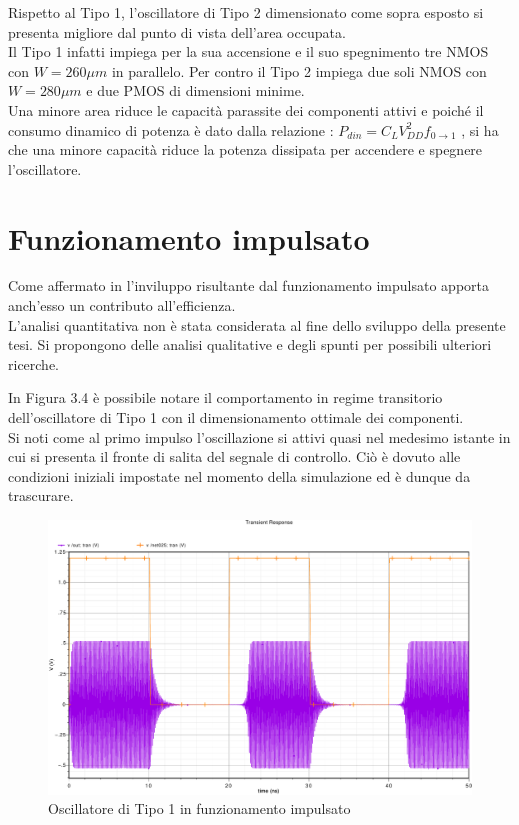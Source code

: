 \documentclass[a4paper, 12pt]{memoir}
\begin{document}
Rispetto al Tipo 1, l'oscillatore di Tipo 2 dimensionato come sopra esposto si
presenta migliore dal punto di vista dell'area occupata.\\
Il Tipo 1 infatti impiega per la sua accensione e il suo spegnimento tre NMOS
con $W = 260 \mu m$ in parallelo. Per contro il Tipo 2 impiega due soli NMOS
con $W = 280 \mu m$ e due PMOS di dimensioni minime.\\
Una minore area riduce le capacità parassite dei componenti attivi e poiché il
consumo dinamico di potenza è dato dalla relazione :
$P_{din} = C_L V_{DD}^2 f_{0 \rightarrow 1}$ \@\cite[p. 230]{RazaviED}, si ha
che una minore capacità riduce la potenza dissipata per accendere e spegnere
l'oscillatore.

\section{Funzionamento impulsato}
Come affermato in \cite{Neviani14} l'inviluppo risultante dal funzionamento
impulsato apporta anch'esso un contributo all'efficienza.\\
L'analisi quantitativa non è stata considerata al fine dello sviluppo della
presente tesi. Si propongono delle analisi qualitative e degli spunti per
possibili ulteriori ricerche.

In Figura 3.4 è possibile notare il comportamento in regime transitorio
dell'oscillatore di Tipo 1 con il dimensionamento ottimale dei componenti.\\
Si noti come al primo impulso l'oscillazione si attivi quasi nel medesimo
istante in cui si presenta il fronte di salita del segnale di controllo. Ciò è
dovuto alle condizioni iniziali impostate nel momento della simulazione ed è
dunque da trascurare. 
\begin{figure}[h]
\centering
\includegraphics[width=\textheight, angle=90]{images/tipo1-impulsato.pdf}
\caption{Oscillatore di Tipo 1 in funzionamento impulsato}
\end{figure}
\end{document}
